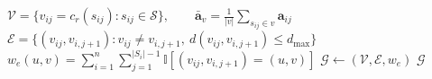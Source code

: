 \documentclass[11pt]{article}
\begin{document}
\begin{algorithm}[H]
\begin{algorithmic}[1]
\State \(\displaystyle
\mathcal{V}=\{v_{ij}=c_r(s_{ij}):s_{ij}\in\mathcal{S}\},\qquad
\bar{\mathbf a}_v=\frac{1}{|v|}
\sum_{s_{ij}\in v}\mathbf a_{ij}\)
\State \(\displaystyle
\mathcal{E}=\{(v_{ij},v_{i,j+1}):
v_{ij}\ne v_{i,j+1},\
d(v_{ij},v_{i,j+1})
\le d_{\max}\}\)
\State \(\displaystyle
w_e(u,v)=\sum_{i=1}^{n}\sum_{j=1}^{|S_i|-1}
\mathbb{I}[(v_{ij},v_{i,j+1})=(u,v)]\)
\State \(\mathcal{G}\gets(\mathcal{V},\mathcal{E},w_e)\)
\State \Return \(\mathcal{G}\)
\end{algorithmic}
\end{algorithm}
\end{document}
